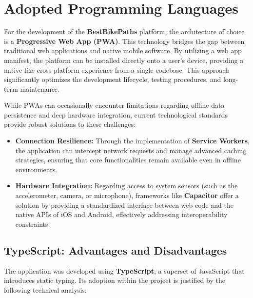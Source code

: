 \section{Adopted Programming Languages}

For the development of the \textbf{BestBikePaths} platform, the architecture of choice is a \textbf{Progressive Web App (PWA)}. This technology bridges the gap between traditional web applications and native mobile software. By utilizing a web app manifest, the platform can be installed directly onto a user's device, providing a native-like cross-platform experience from a single codebase. This approach significantly optimizes the development lifecycle, testing procedures, and long-term maintenance.

While PWAs can occasionally encounter limitations regarding offline data persistence and deep hardware integration, current technological standards provide robust solutions to these challenges:

\begin{itemize}
    \item \textbf{Connection Resilience:} Through the implementation of \textbf{Service Workers}, the application can intercept network requests and manage advanced caching strategies, ensuring that core functionalities remain available even in offline environments.
    \item \textbf{Hardware Integration:} Regarding access to system sensors (such as the accelerometer, camera, or microphone), frameworks like \textbf{Capacitor} offer a solution by providing a standardized interface between web code and the native APIs of iOS and Android, effectively addressing interoperability constraints.
\end{itemize}

\subsection*{TypeScript: Advantages and Disadvantages}

The application was developed using \textbf{TypeScript}, a superset of JavaScript that introduces static typing. Its adoption within the project is justified by the following technical analysis:

